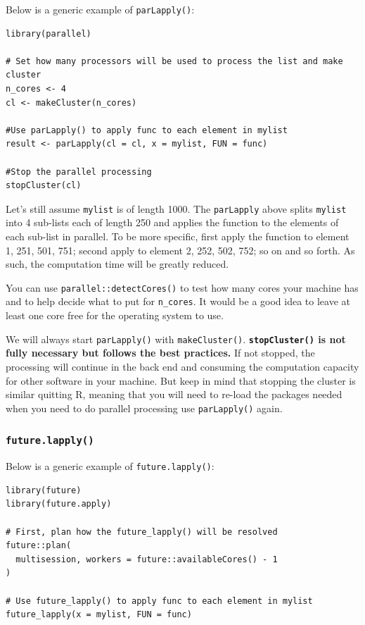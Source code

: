 \documentclass[
]{book}
\begin{document}
Below is a generic example of \texttt{parLapply()}:

\begin{verbatim}
library(parallel)

# Set how many processors will be used to process the list and make cluster
n_cores <- 4
cl <- makeCluster(n_cores)

#Use parLapply() to apply func to each element in mylist
result <- parLapply(cl = cl, x = mylist, FUN = func)

#Stop the parallel processing
stopCluster(cl)
\end{verbatim}

Let's still assume \texttt{mylist} is of length 1000. The \texttt{parLapply} above splits \texttt{mylist} into 4 sub-lists each of length 250 and applies the function to the elements of each sub-list in parallel. To be more specific, first apply the function to element 1, 251, 501, 751; second apply to element 2, 252, 502, 752; so on and so forth. As such, the computation time will be greatly reduced.

You can use \texttt{parallel::detectCores()} to test how many cores your machine has and to help decide what to put for \texttt{n\_cores}. It would be a good idea to leave at least one core free for the operating system to use.

We will always start \texttt{parLapply()} with \texttt{makeCluster()}. \textbf{\texttt{stopCluster()} is not fully necessary but follows the best practices.} If not stopped, the processing will continue in the back end and consuming the computation capacity for other software in your machine. But keep in mind that stopping the cluster is similar quitting R, meaning that you will need to re-load the packages needed when you need to do parallel processing use \texttt{parLapply()} again.

\subsubsection{\texorpdfstring{\texttt{future.lapply()}}{future.lapply()}}\label{future.lapply}

Below is a generic example of \texttt{future.lapply()}:

\begin{verbatim}
library(future)
library(future.apply)

# First, plan how the future_lapply() will be resolved
future::plan(
  multisession, workers = future::availableCores() - 1
)

# Use future_lapply() to apply func to each element in mylist
future_lapply(x = mylist, FUN = func)
\end{verbatim}
\end{document}
